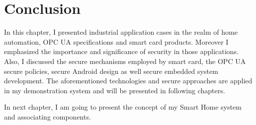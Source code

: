 \section{Conclusion}
In this chapter, I presented industrial application cases in the realm of home automation, OPC UA specifications and smart card products. Moreover I emphasized the importance and significance of security in those applications. Also, I discussed the secure mechanisms employed by smart card, the OPC UA secure policies, secure Android design as well secure embedded system development. The aforementioned technologies and secure approaches are applied in my demonstration system and will be presented in following chapters.

In next chapter, I am going to present the concept of my Smart Home system and associating components.